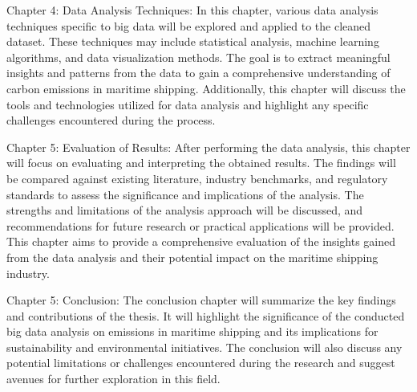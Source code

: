 \noindent Chapter 4: Data Analysis Techniques:
In this chapter, various data analysis techniques specific to big data will be explored and applied to the cleaned dataset.
These techniques may include statistical analysis, machine learning algorithms, and data visualization methods.
The goal is to extract meaningful insights and patterns from the data to gain a comprehensive understanding of carbon emissions in maritime shipping.
Additionally, this chapter will discuss the tools and technologies utilized for data analysis and highlight any specific challenges encountered during the process.

\noindent Chapter 5: Evaluation of Results:
After performing the data analysis, this chapter will focus on evaluating and interpreting the obtained results.
The findings will be compared against existing literature, industry benchmarks, and regulatory standards to assess the significance and implications of the analysis.
The strengths and limitations of the analysis approach will be discussed, and recommendations for future research or practical applications will be provided.
This chapter aims to provide a comprehensive evaluation of the insights gained from the data analysis and their potential impact on the maritime shipping industry.

\noindent Chapter 5: Conclusion:
The conclusion chapter will summarize the key findings and contributions of the thesis.
It will highlight the significance of the conducted big data analysis on emissions in maritime shipping and its implications for sustainability and environmental initiatives.
The conclusion will also discuss any potential limitations or challenges encountered during the research and suggest avenues for further exploration in this field.